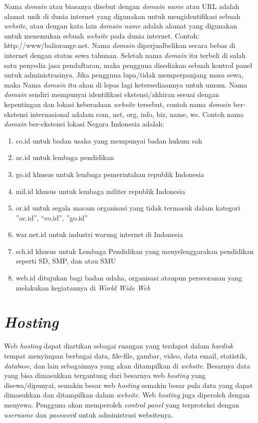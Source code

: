 Nama \textit{domain} atau biasanya disebut dengan \textit{domain name} atau URL adalah alamat unik di dunia internet yang digunakan untuk mengidentifikasi sebuah \textit{website}, atau dengan kata lain \textit{domain name} adalah alamat yang digunakan untuk menemukan sebuah \textit{website} pada dunia internet. Contoh: http://www/baliorange.net. Nama \textit{domain} diperjualbelikan secara bebas di internet dengan status sewa tahunan. Seletah nama \textit{domain} itu terbeli di salah satu penyedia jasa pendaftaran, maka pengguna disediakan sebuah kontrol panel untuk administrasinya. Jika pengguna lupa/tidak memperpanjang masa sewa, maka Nama \textit{domain} itu akan di lepas lagi ketersediaannya untuk umum. Nama \textit{domain} sendiri mempunyai identifikasi ekstensi/akhiran sesuai dengan kepentingan dan lokasi keberadaan \textit{website} tersebut, contoh nama \textit{domain} ber-ekstensi internasional adalam com, net, org, info, biz, name, ws. Contoh nama \textit{domain} ber-ekstensi lokasi Negara Indonesia adalah:

\begin{enumerate}
	\item co.id untuk badan usaha yang mempunyai badan hukum sah
	\item ac.id untuk lembaga pendidikan
	\item go.id khusus untuk lembaga pemerintahan republik Indonesia
	\item mil.id khusus untuk lembaga militer republik Indonesia
	\item or.id untuk segala macam organisasi yang tidak termasuk dalam kategori ”ac.id”, “co,id”, ”go.id”
	\item war.net.id untuk industri warung internet di Indonesia
	\item sch.id khusus untuk Lembaga Pendidikan yang menyelenggarakan pendidikan seperti SD, SMP, dan atau SMU
	\item web.id ditujukan bagi badan udaha, organisasi ataupun perseoranan yang melakukan kegiatannya di\textit{ World Wide Web}
\end{enumerate}

\section{\textit{Hosting}}

Web \textit{hosting} dapat diartikan sebagai ruangan yang terdapat dalam \textit{hardisk} tempat menyimpan berbagai data, file-file, gambar, video, data email, statistik, \textit{database}, dan lain sebagainnya yang akan ditampilkan di \textit{website}. Besarnya data yang bisa dimasukkan tergantung dari besarnya web \textit{hosting} yang disewa/dipunyai, semakin besar web \textit{hosting} semakin besar pula data yang dapat dimasukkan dan ditampilkan dalam \textit{website}. Web \textit{hosting} juga diperoleh dengan menyewa. Pengguna akan memperoleh \textit{control panel} yang terproteksi dengan \textit{username} dan \textit{password} untuk administrasi websitenya.

